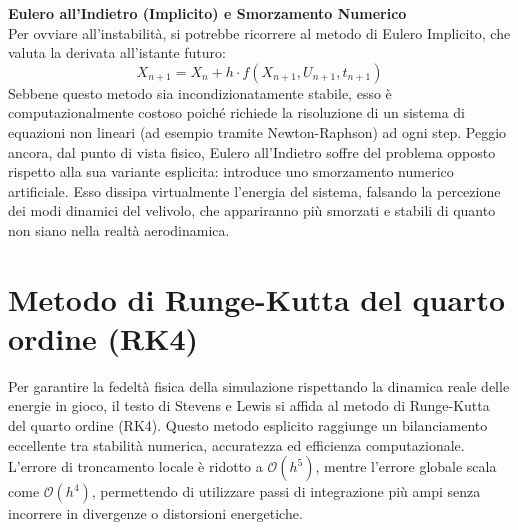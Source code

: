 \textbf{Eulero all'Indietro (Implicito) e Smorzamento Numerico}\\
Per ovviare all'instabilità, si potrebbe ricorrere al metodo di Eulero Implicito, che valuta la derivata all'istante futuro:
\begin{equation}
X_{n+1} = X_n + h \cdot f(X_{n+1}, U_{n+1}, t_{n+1})
\end{equation}
Sebbene questo metodo sia incondizionatamente stabile, esso è computazionalmente costoso poiché richiede la risoluzione di un sistema di equazioni non lineari (ad esempio tramite Newton-Raphson) ad ogni step. Peggio ancora, dal punto di vista fisico, Eulero all'Indietro soffre del problema opposto rispetto alla sua variante esplicita: introduce uno smorzamento numerico artificiale. Esso dissipa virtualmente l'energia del sistema, falsando la percezione dei modi dinamici del velivolo, che appariranno più smorzati e stabili di quanto non siano nella realtà aerodinamica.

\section{Metodo di Runge-Kutta del quarto ordine (RK4)}

Per garantire la fedeltà fisica della simulazione rispettando la dinamica reale delle energie in gioco, il testo di Stevens e Lewis\cite{stevens2015aircraft} si affida al metodo di Runge-Kutta del quarto ordine (RK4). Questo metodo esplicito raggiunge un bilanciamento eccellente tra stabilità numerica, accuratezza ed efficienza computazionale. L'errore di troncamento locale è ridotto a $\mathcal{O}(h^5)$, mentre l'errore globale scala come $\mathcal{O}(h^4)$, permettendo di utilizzare passi di integrazione più ampi senza incorrere in divergenze o distorsioni energetiche.

